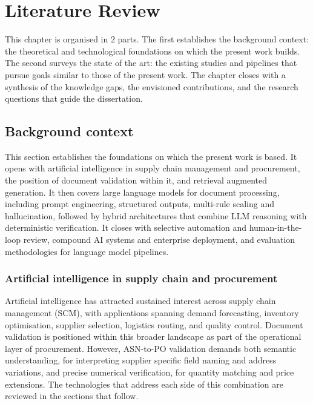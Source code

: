 
\chapter{Literature Review} \label{chap:lreview}

This chapter is organised in 2 parts. The first establishes the background context: the theoretical and technological foundations on which the present work builds.  The second surveys the state of the art: the existing studies and pipelines that pursue goals similar to those of the present work. The chapter closes with a synthesis of the knowledge gaps, the envisioned contributions, and the research questions that guide the dissertation.


\section{Background context}
\label{sec:lr:background}

This section establishes the foundations on which the present work is based. It opens with artificial intelligence in supply chain management and procurement, the position of document validation within it, and retrieval augmented generation. It then covers large language models for document processing, including prompt engineering, structured outputs, multi-rule scaling and hallucination, followed by hybrid architectures that combine LLM reasoning with deterministic verification. It closes with selective automation and human-in-the-loop review, compound AI systems and enterprise deployment, and evaluation methodologies for language model pipelines.


\subsection{Artificial intelligence in supply chain and procurement}
\label{sec:lr:ai-scm}

Artificial intelligence has attracted sustained interest across supply chain management (SCM), with applications spanning demand forecasting, inventory optimisation, supplier selection, logistics routing, and quality control. Document validation is positioned within this broader landscape as part of the operational layer of procurement. However, ASN-to-PO validation demands both semantic understanding, for interpreting supplier specific field naming and address variations, and precise numerical verification, for quantity matching and price extensions. The technologies that address each side of this combination are reviewed in the sections that follow.


